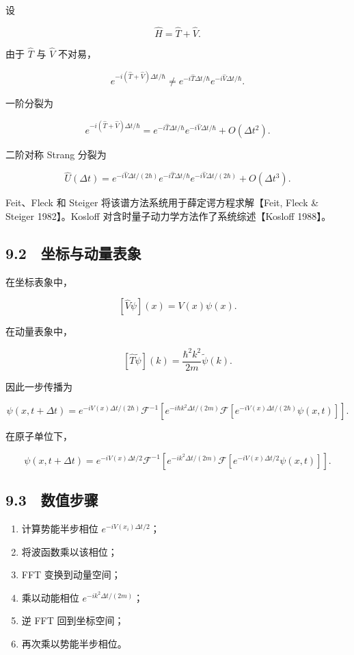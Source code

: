 \documentclass[
  a4paper,
]{ctexbook}
\providecommand{\tightlist}{%
  \setlength{\itemsep}{0pt}\setlength{\parskip}{0pt}}
\begin{document}
设

\[
\hat H=\hat T+\hat V.
\]

由于 \(\hat T\) 与 \(\hat V\) 不对易，

\[
e^{-i(\hat T+\hat V)\Delta t/\hbar}
\ne
e^{-i\hat T\Delta t/\hbar}
e^{-i\hat V\Delta t/\hbar}.
\]

一阶分裂为

\[
e^{-i(\hat T+\hat V)\Delta t/\hbar}
=
e^{-i\hat T\Delta t/\hbar}
e^{-i\hat V\Delta t/\hbar}
+
O(\Delta t^2).
\]

二阶对称 Strang 分裂为

\[
\hat U(\Delta t)
=
e^{-i\hat V\Delta t/(2\hbar)}
e^{-i\hat T\Delta t/\hbar}
e^{-i\hat V\Delta t/(2\hbar)}
+
O(\Delta t^3).
\]

Feit、Fleck 和 Steiger 将该谱方法系统用于薛定谔方程求解【Feit, Fleck \&
Steiger 1982】。Kosloff 对含时量子动力学方法作了系统综述【Kosloff
1988】。

\hypertarget{ux5750ux6807ux4e0eux52a8ux91cfux8868ux8c61}{%
\subsection{9.2　坐标与动量表象}\label{ux5750ux6807ux4e0eux52a8ux91cfux8868ux8c61}}

在坐标表象中，

\[
[\hat V\psi](x)=V(x)\psi(x).
\]

在动量表象中，

\[
[\hat T\tilde\psi](k)=\frac{\hbar^2k^2}{2m}\tilde\psi(k).
\]

因此一步传播为

\[
\psi(x,t+\Delta t)
=
e^{-iV(x)\Delta t/(2\hbar)}
\mathcal{F}^{-1}
\left[
e^{-i\hbar k^2\Delta t/(2m)}
\mathcal{F}
\left[
e^{-iV(x)\Delta t/(2\hbar)}
\psi(x,t)
\right]
\right].
\]

在原子单位下，

\[
\psi(x,t+\Delta t)
=
e^{-iV(x)\Delta t/2}
\mathcal{F}^{-1}
\left[
e^{-ik^2\Delta t/(2m)}
\mathcal{F}
\left[
e^{-iV(x)\Delta t/2}
\psi(x,t)
\right]
\right].
\]

\hypertarget{ux6570ux503cux6b65ux9aa4}{%
\subsection{9.3　数值步骤}\label{ux6570ux503cux6b65ux9aa4}}

\begin{enumerate}
\def\labelenumi{\arabic{enumi}.}
\tightlist
\item
  计算势能半步相位 \(e^{-iV(x_i)\Delta t/2}\)；
\item
  将波函数乘以该相位；
\item
  FFT 变换到动量空间；
\item
  乘以动能相位 \(e^{-ik^2\Delta t/(2m)}\)；
\item
  逆 FFT 回到坐标空间；
\item
  再次乘以势能半步相位。
\end{enumerate}
\end{document}
